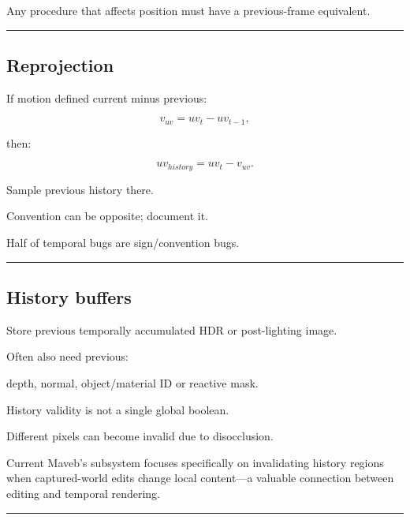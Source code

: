Any procedure that affects position must have a previous-frame equivalent.

\begin{center}\rule{0.5\linewidth}{0.5pt}\end{center}

\subsection{Reprojection}\label{04-visual-computing-ii-ch040-reprojection}

\hypertarget{04-visual-computing-ii-ch040-reprojection}{}

If motion defined current minus previous:

\[
v_{uv}
=
uv_t-uv_{t-1},
\]

then:

\[
\boxed{
uv_{history}
=
uv_t-v_{uv}.
}
\]

Sample previous history there.

Convention can be opposite; document it.

Half of temporal bugs are sign/convention bugs.

\begin{center}\rule{0.5\linewidth}{0.5pt}\end{center}

\subsection{History buffers}\label{04-visual-computing-ii-ch040-history-buffers}

\hypertarget{04-visual-computing-ii-ch040-history-buffers}{}

Store previous temporally accumulated HDR or post-lighting image.

Often also need previous:

depth, normal, object/material ID or reactive mask.

History validity is not a single global boolean.

Different pixels can become invalid due to disocclusion.

Current Maveb's  subsystem focuses specifically on invalidating history regions when captured-world edits change local content---a valuable connection between editing and temporal rendering.

\begin{center}\rule{0.5\linewidth}{0.5pt}\end{center}

